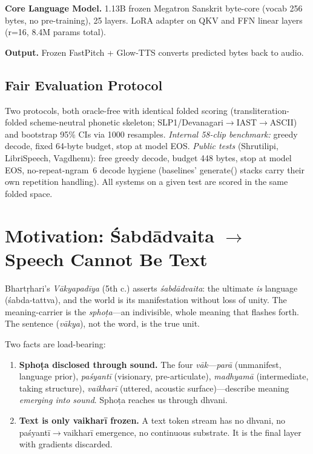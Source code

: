 \documentclass[11pt]{article}
\begin{document}
\textbf{Core Language Model.} 1.13B frozen Megatron Sanskrit byte-core (vocab 256 bytes, no pre-training), 25 layers. LoRA adapter on QKV and FFN linear layers (r=16, 8.4M params total).

\textbf{Output.} Frozen FastPitch + Glow-TTS converts predicted bytes back to audio.

\subsection{Fair Evaluation Protocol}

Two protocols, both oracle-free with identical folded scoring (transliteration-folded scheme-neutral phonetic skeleton; SLP1/Devanagari$\to$IAST$\to$ASCII) and bootstrap 95\% CIs via 1000 resamples. \emph{Internal 58-clip benchmark:} greedy decode, fixed 64-byte budget, stop at model EOS. \emph{Public tests} (Shrutilipi, LibriSpeech, Vagdhenu): free greedy decode, budget 448 bytes, stop at model EOS, no-repeat-ngram~6 decode hygiene (baselines' generate() stacks carry their own repetition handling). All systems on a given test are scored in the same folded space.

\section{Motivation: Śabdādvaita $\to$ Speech Cannot Be Text}

Bhartṛhari's \emph{Vākyapadīya} (5th c.) asserts \emph{śabdādvaita}: the ultimate \emph{is} language (śabda-tattva), and the world is its manifestation without loss of unity. The meaning-carrier is the \emph{sphoṭa}---an indivisible, whole meaning that flashes forth. The sentence (\emph{vākya}), not the word, is the true unit.

Two facts are load-bearing:
\begin{enumerate}
\item \textbf{Sphoṭa disclosed through sound.} The four \emph{vāk}---\emph{parā} (unmanifest, language prior), \emph{paśyantī} (visionary, pre-articulate), \emph{madhyamā} (intermediate, taking structure), \emph{vaikharī} (uttered, acoustic surface)---describe meaning \emph{emerging into sound}. Sphoṭa reaches us through dhvani.
\item \textbf{Text is only vaikharī frozen.} A text token stream has no dhvani, no paśyantī$\to$vaikharī emergence, no continuous substrate. It is the final layer with gradients discarded.
\end{enumerate}
\end{document}
